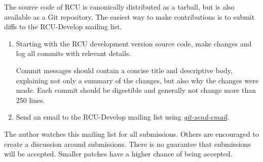 The source code of RCU is canonically distributed as a tarball, but is also available as a Git repository. The easiest way to make contributions is to submit diffs to the RCU-Develop mailing list.

\begin{enumerate}
\item{Starting with the RCU development version source code, make changes and log all commits with relevant details.

Commit messages should contain a concise title and descriptive body, explaining not only a summary of the changes, but also why the changes were made. Each commit should be digestible and generally not change more than 250 lines.}

\item{Send an email to the RCU-Develop mailing list using \textit{\href{https://git-scm.com/docs/git-send-email}{git-send-email}}.}

\end{enumerate}

The author watches this mailing list for all submissions. Others are encouraged to create a discussion around submissions. There is no guarantee that submissions will be accepted. Smaller patches have a higher chance of being accepted.

